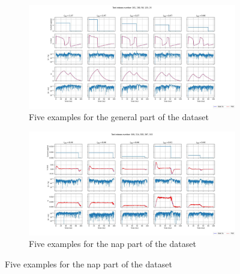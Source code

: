 \documentclass{article}
\begin{document}
\begin{center}
    \begin{figure}[ht]
        \begin{subfigure}{.5\textwidth}
            \centering
            \includegraphics[width=1.8\linewidth]{images/general_error_FHN.jpg}
            \caption{Five examples for the general part of the dataset}
            \label{FHN_err_general}
        \end{subfigure}

        \begin{subfigure}{.5\textwidth}
            \centering
            \includegraphics[width=1.8\linewidth]{images/nap_error_FHN.jpg}
            \caption{Five examples for the nap part of the dataset}
            \label{FHN_err_nap}
        \end{subfigure}


\end{figure}
\end{center}
\end{document}
